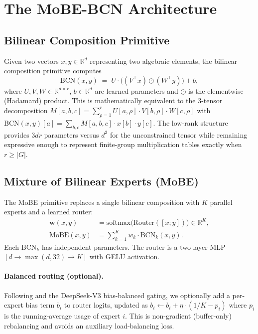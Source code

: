 \documentclass[11pt]{article}
\begin{document}
\section{The MoBE-BCN Architecture}
\label{sec:arch}

\subsection{Bilinear Composition Primitive}

Given two vectors $x, y \in \mathbb{R}^d$ representing two algebraic
elements, the bilinear composition primitive computes
\begin{equation}
  \text{BCN}(x, y) \;=\; U \cdot \bigl((V^\top x) \odot (W^\top y)\bigr) + b,
  \label{eq:bcn}
\end{equation}
where $U, V, W \in \mathbb{R}^{d \times r}$, $b \in \mathbb{R}^d$ are
learned parameters and $\odot$ is the elementwise (Hadamard) product.
This is mathematically equivalent to the 3-tensor decomposition
$M[a, b, c] = \sum_{\rho=1}^{r} U[a, \rho] \cdot V[b, \rho] \cdot W[c, \rho]$
with $\text{BCN}(x, y)[a] = \sum_{b, c} M[a, b, c] \cdot x[b] \cdot y[c]$.
The low-rank structure provides $3 d r$ parameters versus $d^3$ for
the unconstrained tensor while remaining expressive enough to represent
finite-group multiplication tables exactly when $r \geq |G|$.

\subsection{Mixture of Bilinear Experts (MoBE)}

The MoBE primitive replaces a single bilinear composition with $K$
parallel experts and a learned router:
\begin{align}
  \mathbf{w}(x, y) &= \mathrm{softmax}\bigl(\text{Router}([x ; y])\bigr) \in \mathbb{R}^K,
  \\
  \text{MoBE}(x, y) &= \sum_{k=1}^{K} w_k \cdot \text{BCN}_k(x, y).
  \label{eq:mobe}
\end{align}
Each $\text{BCN}_k$ has independent parameters. The router is a two-layer
MLP $[d \to \max(d, 32) \to K]$ with GELU activation.

\paragraph{Balanced routing (optional).}
Following \citet{shazeer2017outrageously} and the DeepSeek-V3
bias-balanced gating, we optionally add a per-expert bias term $b_i$ to
router logits, updated as $b_i \leftarrow b_i + \eta \cdot (1/K - p_i)$
where $p_i$ is the running-average usage of expert $i$. This is
non-gradient (buffer-only) rebalancing and avoids an auxiliary
load-balancing loss.
\end{document}
